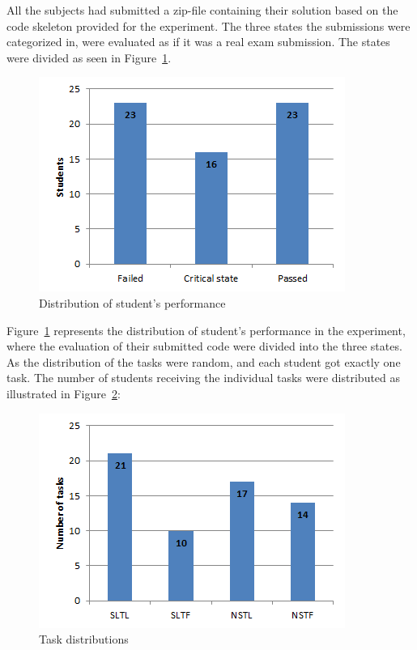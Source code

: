 \documentclass{sig-alternate-05-2015}
\begin{document}
All the subjects had submitted a zip-file containing their solution based on the code skeleton provided for the experiment. The three states the submissions were categorized in, were evaluated as if it was a real exam submission.
The states were divided as seen in Figure~\ref{fig:DistributionOfStudentPerformance}.

\begin{figure}[!ht]
	\centering
	\includegraphics[width=1\linewidth]{img01}
	\caption{Distribution of student's performance}
	\label{fig:DistributionOfStudentPerformance}
\end{figure}
Figure~\ref{fig:DistributionOfStudentPerformance} represents the distribution of student's performance in the experiment, where the evaluation of their submitted code were divided into the three states.\\

As the distribution of the tasks were random, and each student got exactly one task. The number of students receiving the individual tasks were distributed as illustrated in Figure~\ref{fig:TaskDistributions}:

\begin{figure}[!ht]
	\centering
	\includegraphics[width=1\linewidth]{img02}
	\caption{Task distributions}
	\label{fig:TaskDistributions}
\end{figure}
\end{document}
